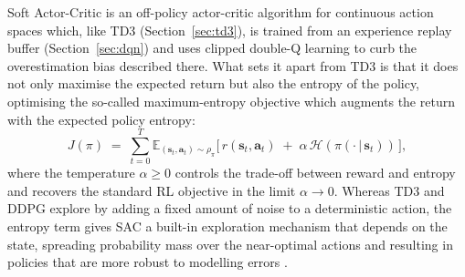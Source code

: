 \documentclass{article}
\begin{document}
Soft Actor-Critic \citep{haarnoja2018soft} is an off-policy actor-critic algorithm for continuous action spaces which, like TD3 (Section~\ref{sec:td3}), is trained from an experience replay buffer (Section~\ref{sec:dqn}) and uses clipped double-Q learning to curb the overestimation bias described there. What sets it apart from TD3 is that it does not only maximise the expected return but also the entropy of the policy, optimising the so-called maximum-entropy objective which augments the return with the expected policy entropy:
\begin{equation}
    J(\pi) \;=\; \sum_{t=0}^{T} \mathbb{E}_{(\mathbf{s}_t,\mathbf{a}_t)\sim \rho_\pi}
    \Big[\, r(\mathbf{s}_t,\mathbf{a}_t) \;+\; \alpha\,\mathcal{H}\!\left(\pi(\cdot\,|\,\mathbf{s}_t)\right) \,\Big],
    \label{eq:sac-objective}
\end{equation}
where the temperature $\alpha \ge 0$ controls the trade-off between reward and entropy and recovers the standard RL objective in the limit $\alpha \to 0$. Whereas TD3 and DDPG explore by adding a fixed amount of noise to a deterministic action, the entropy term gives SAC a built-in exploration mechanism that depends on the state, spreading probability mass over the near-optimal actions and resulting in policies that are more robust to modelling errors \citep{ziebart2010thesis,haarnoja2017energy}.
\end{document}
